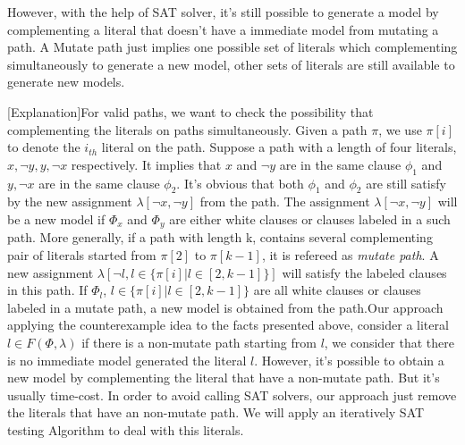 
 However, with the help of SAT solver, it's still possible to generate a model by complementing a literal that doesn't have a immediate model from mutating a path. A Mutate path just implies one possible set of literals which complementing simultaneously to generate a new model, other sets of literals are still available to generate new models.

 [Explanation]For valid paths, we want to check the possibility that complementing the literals on paths simultaneously. Given a path $\pi$, we use $\pi[i]$ to denote the $i_{th}$ literal on the path. Suppose a path with a length of four literals, $x, \neg y, y, \neg x$ respectively. It implies that $x$ and $\neg y$ are in the same clause $\phi_1$ and $y, \neg x$ are in the same clause $\phi_2$. It's obvious that both $\phi_1$ and $\phi_2$ are still satisfy by the new assignment $\lambda[\neg x, \neg y]$ from the path. The assignment $\lambda[\neg x, \neg y]$ will be a new model if $\Phi_x$ and $\Phi_y$ are either white clauses or clauses labeled in a such path. More generally, if a path with length k, contains several complementing pair of literals started from $\pi[2]$ to $\pi[k-1]$, it is refereed as \emph{mutate path}. A new assignment $\lambda[\neg l, l\in\{\pi[i] | l\in[2, k-1]\}]$ will satisfy the labeled clauses in this path. If $\Phi_l$, $l\in\{\pi[i] | l\in[2, k-1]\}$ are all white clauses or clauses labeled in a mutate path, a new model is obtained from the path.Our approach applying the counterexample idea to the facts presented above, consider a literal $l\in F(\Phi, \lambda)$ if there is a non-mutate path starting from $l$, we consider that there is no immediate model generated the literal $l$.
 However, it's possible to obtain a new model by complementing the literal that have a non-mutate path. But it's usually time-cost. In order to avoid calling SAT solvers, our approach just remove the literals that have an non-mutate path. We will apply an iteratively SAT testing Algorithm to deal with this literals.


